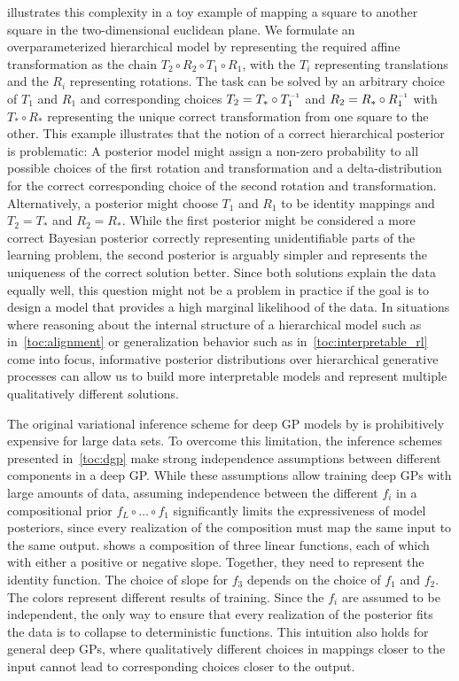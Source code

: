  illustrates this complexity in a toy example of mapping a square to another square in the two-dimensional euclidean plane.
We formulate an overparameterized hierarchical model by representing the required affine transformation as the chain $T_2 \circ R_2 \circ T_1 \circ R_1$, with the $T_i$ representing translations and the $R_i$ representing rotations.
The task can be solved by an arbitrary choice of $T_1$ and $R_1$ and corresponding choices $T_2 = T_\ast \circ T_1\inv$ and $R_2 = R_\ast \circ R_1\inv$ with $T_\ast \circ R_\ast$ representing the unique correct transformation from one square to the other.
This example illustrates that the notion of a correct hierarchical posterior is problematic:
A posterior model might assign a non-zero probability to all possible choices of the first rotation and transformation and a delta-distribution for the correct corresponding choice of the second rotation and transformation.
Alternatively, a posterior might choose $T_1$ and $R_1$ to be identity mappings and $T_2 = T_\ast$ and $R_2 = R_\ast$.
While the first posterior might be considered a more correct Bayesian posterior correctly representing unidentifiable parts of the learning problem, the second posterior is arguably simpler and represents the uniqueness of the correct solution better.
Since both solutions explain the data equally well, this question might not be a problem in practice if the goal is to design a model that provides a high marginal likelihood of the data.
In situations where reasoning about the internal structure of a hierarchical model such as in~\cref{toc:alignment} or generalization behavior such as in~\cref{toc:interpretable_rl} come into focus, informative posterior distributions over hierarchical generative processes can allow us to build more interpretable models and represent multiple qualitatively different solutions.

The original variational inference scheme for deep GP models by \textcite{damianou_deep_2013} is prohibitively expensive for large data sets.
To overcome this limitation, the inference schemes presented in~\cref{toc:dgp} make strong independence assumptions between different components in a deep GP.
While these assumptions allow training deep GPs with large amounts of data, assuming independence between the different $f_i$ in a compositional prior $f_L \circ \dots \circ f_1$ significantly limits the expressiveness of model posteriors, since every realization of the composition must map the same input to the same output.
 shows a composition of three linear functions, each of which with either a positive or negative slope.
Together, they need to represent the identity function.
The choice of slope for $f_3$ depends on the choice of $f_1$ and $f_2$.
The colors represent different results of training.
Since the $f_i$ are assumed to be independent, the only way to ensure that every realization of the posterior fits the data is to collapse to deterministic functions.
This intuition also holds for general deep GPs, where qualitatively different choices in mappings closer to the input cannot lead to corresponding choices closer to the output.

